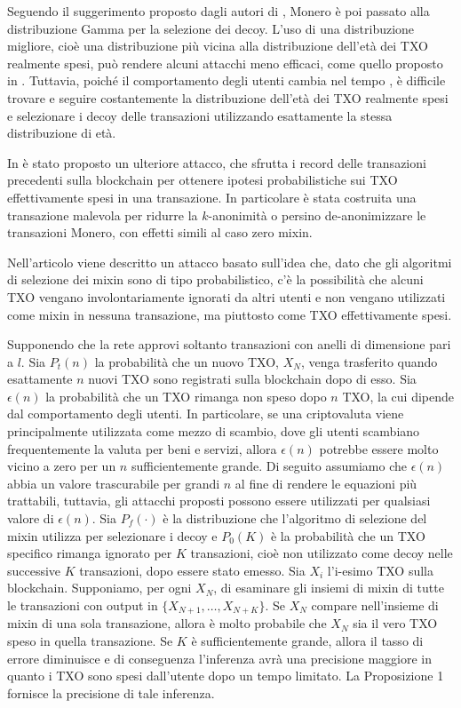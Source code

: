Seguendo il suggerimento proposto dagli autori di \cite{ref4}, Monero è poi passato alla distribuzione Gamma per la selezione dei decoy. L'uso di una distribuzione migliore, cioè una distribuzione più vicina alla distribuzione dell'età dei TXO realmente spesi, può rendere alcuni attacchi meno efficaci, come quello proposto in \cite{ref2}. Tuttavia, poiché il comportamento degli utenti cambia nel tempo \cite{reference7}, è difficile trovare e seguire costantemente la distribuzione dell'età dei TXO realmente spesi e selezionare i decoy delle transazioni utilizzando esattamente la stessa distribuzione di età.

In \cite{ref5} è stato proposto un ulteriore attacco, che sfrutta i record delle transazioni precedenti sulla blockchain per ottenere ipotesi probabilistiche sui TXO effettivamente spesi in una transazione. In particolare è stata costruita una transazione malevola per ridurre la $k$-anonimità o persino de-anonimizzare le transazioni Monero, con effetti simili al caso zero mixin.

Nell'articolo \cite{refnew} viene descritto un attacco basato sull'idea che, dato che gli algoritmi di selezione dei mixin sono di tipo probabilistico, c'è la possibilità che alcuni TXO vengano involontariamente ignorati da altri utenti e non vengano utilizzati come mixin in nessuna transazione, ma piuttosto come TXO effettivamente spesi. 

Supponendo che la rete approvi soltanto transazioni con anelli di dimensione pari a $l$. Sia \( P_t(n) \) la probabilità che un nuovo TXO, \( X_N \), venga trasferito quando esattamente \( n \) nuovi TXO sono registrati sulla blockchain dopo di esso. Sia $\epsilon(n)$ la probabilità che un TXO rimanga non speso dopo $n$ TXO, la cui dipende dal comportamento degli utenti. In particolare, se una criptovaluta viene principalmente utilizzata come mezzo di scambio, dove gli utenti scambiano frequentemente la valuta per beni e servizi, allora \(\epsilon(n)\) potrebbe essere molto vicino a zero per un \( n \) sufficientemente grande. Di seguito assumiamo che \(\epsilon(n)\) abbia un valore trascurabile per grandi \( n \) al fine di rendere le equazioni più trattabili, tuttavia, gli attacchi proposti possono essere utilizzati per qualsiasi valore di \(\epsilon(n)\).  Sia \( P_f(\cdot) \) è la distribuzione che l'algoritmo di selezione del mixin utilizza per selezionare i decoy e $P_{0}(K)$ è la probabilità che un TXO specifico rimanga ignorato per $K$ transazioni, cioè non utilizzato come decoy nelle successive $K$ transazioni, dopo essere stato emesso.
Sia \( X_i \) l'i-esimo TXO sulla blockchain. Supponiamo, per ogni \( X_N \), di esaminare gli insiemi di mixin di tutte le transazioni con output in \( \{X_{N+1}, \dots, X_{N+K}\} \). Se \( X_N \) compare nell'insieme di mixin di una sola transazione, allora è molto probabile che \( X_N \) sia il vero TXO speso in quella transazione. Se \( K \) è sufficientemente grande, allora il tasso di errore diminuisce e di conseguenza l'inferenza avrà una precisione maggiore in quanto i TXO sono spesi dall'utente dopo un tempo limitato. La Proposizione 1 fornisce la precisione di tale inferenza.

